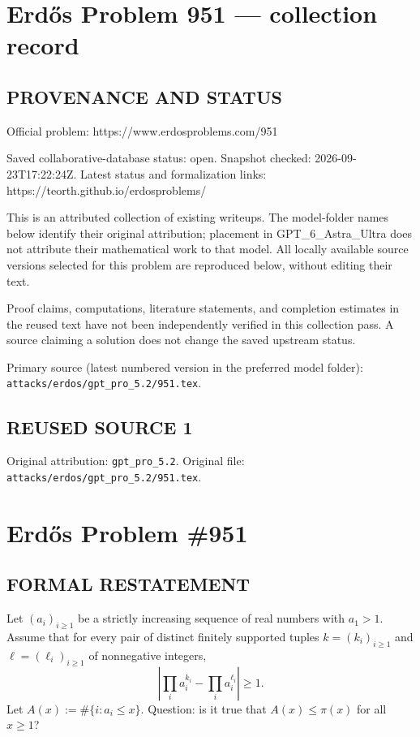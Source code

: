 \section*{Erd\H{o}s Problem 951 --- collection record}

\subsection*{PROVENANCE AND STATUS}
Official problem: https://www.erdosproblems.com/951

Saved collaborative-database status: open.
Snapshot checked: 2026-09-23T17:22:24Z.
Latest status and formalization links: https://teorth.github.io/erdosproblems/

This is an attributed collection of existing writeups. The model-folder names below identify their original attribution; placement in GPT\_6\_Astra\_Ultra does not attribute their mathematical work to that model. All locally available source versions selected for this problem are reproduced below, without editing their text.

Proof claims, computations, literature statements, and completion estimates in the reused text have not been independently verified in this collection pass. A source claiming a solution does not change the saved upstream status.

Primary source (latest numbered version in the preferred model folder): \texttt{attacks/erdos/gpt\_pro\_5.2/951.tex}.

\subsection*{REUSED SOURCE 1}
Original attribution: \texttt{gpt\_pro\_5.2}.
Original file: \texttt{attacks/erdos/gpt\_pro\_5.2/951.tex}.


\section*{Erd\H{o}s Problem \#951}

\subsection*{FORMAL RESTATEMENT}
Let $(a_i)_{i\ge1}$ be a strictly increasing sequence of real numbers with $a_1>1$.
Assume that for every pair of distinct finitely supported tuples $k=(k_i)_{i\ge1}$ and $\ell=(\ell_i)_{i\ge1}$ of nonnegative integers,
\[
\left|\prod_i a_i^{k_i} - \prod_i a_i^{\ell_i}\right|\ge 1.
\]
Let $A(x):=\#\{i: a_i\le x\}$.
Question: is it true that $A(x)\le \pi(x)$ for all $x\ge1$?

